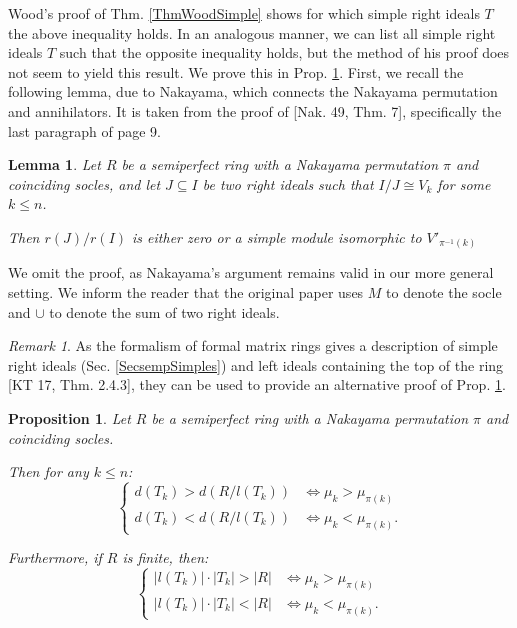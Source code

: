 \documentclass[11pt]{article}
\theoremstyle{plain}
\newtheorem{Lemma}[veta]{Lemma}
\newtheorem{Prop}[veta]{Proposition}
\theoremstyle{remark}
\newtheorem*{remark}{Remark}
\theoremstyle{plain}
\begin{document}
Wood's proof of Thm. \ref{ThmWoodSimple} shows for which simple right ideals $T$ the above inequality holds. In an analogous manner, we can list all simple right ideals $T$ such that the opposite inequality holds, but the method of his proof does not seem to yield this result. We prove this in Prop. \ref{PropQFCardSimple}. First, we recall the following lemma, due to Nakayama, which connects the Nakayama permutation and annihilators. It is taken from the proof of [Nak. 49, Thm. 7], specifically the last paragraph of page 9. 
\begin{Lemma}\label{LemmaAnnofsimple}
Let $R$ be a semiperfect ring with a Nakayama permutation $\pi$ and coinciding socles, and let $J\subseteq I$ be two right ideals such that  $I/J\cong V_k$ for some $k\leq n$.

Then $r(J)/r(I)$ is either zero or a simple module isomorphic to $V'_{\pi^{-1}(k)}$
\end{Lemma}
We omit the proof, as Nakayama's argument remains valid in our more general setting. We inform the reader that the original paper uses $M$ to denote the socle and $\cup$ to denote the sum of two right ideals. 
\begin{remark}
    As the formalism of formal matrix rings gives a description of simple right ideals (Sec. \ref{SecsempSimples}) and left ideals containing the top of the ring [KT 17, Thm. 2.4.3], they can be used to provide an alternative proof of Prop. \ref{PropQFCardSimple}.
\end{remark}
\begin{Prop}\label{PropQFCardSimple}
    Let $R$ be a semiperfect ring with a Nakayama permutation $\pi$ and coinciding socles. 
    
    Then for any $k\leq n$:
 \[
        \begin{cases}
             d(T_k) > d(R/l(T_k)) & \iff \mu_k > \mu_{\pi(k)} \\
             d(T_k) < d(R/l(T_k)) & \iff \mu_k < \mu_{\pi(k)}.
        \end{cases}
    \]
    
    Furthermore, if $R$ is finite, then:
    \[
        \begin{cases}
            |l(T_k)|\cdot|T_k| > |R| & \iff \mu_k > \mu_{\pi(k)} \\
            |l(T_k)|\cdot|T_k| < |R| & \iff \mu_k < \mu_{\pi(k)}.
        \end{cases}
    \]
\end{Prop}
\end{document}
